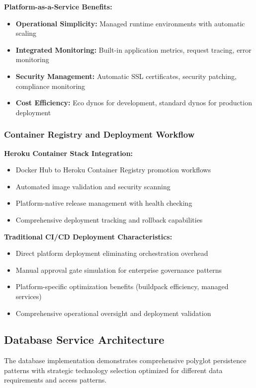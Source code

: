 \textbf{Platform-as-a-Service Benefits:}
\begin{itemize}
\item \textbf{Operational Simplicity:} Managed runtime environments with automatic scaling
\item \textbf{Integrated Monitoring:} Built-in application metrics, request tracing, error monitoring
\item \textbf{Security Management:} Automatic SSL certificates, security patching, compliance monitoring
\item \textbf{Cost Efficiency:} Eco dynos for development, standard dynos for production deployment
\end{itemize}

\subsubsection{Container Registry and Deployment Workflow}

\textbf{Heroku Container Stack Integration:}
\begin{itemize}
\item Docker Hub to Heroku Container Registry promotion workflows
\item Automated image validation and security scanning
\item Platform-native release management with health checking
\item Comprehensive deployment tracking and rollback capabilities
\end{itemize}

\textbf{Traditional CI/CD Deployment Characteristics:}
\begin{itemize}
\item Direct platform deployment eliminating orchestration overhead
\item Manual approval gate simulation for enterprise governance patterns
\item Platform-specific optimization benefits (buildpack efficiency, managed services)
\item Comprehensive operational oversight and deployment validation
\end{itemize}

\subsection{Database Service Architecture}

The database implementation demonstrates comprehensive polyglot persistence patterns with strategic technology selection optimized for different data requirements and access patterns.


